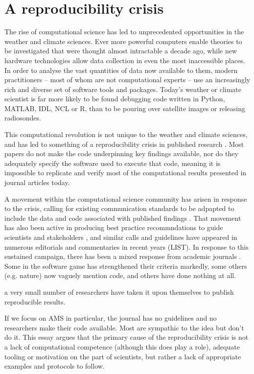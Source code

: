 \section{A reproducibility crisis}
The rise of computational science has led to unprecedented opportunities in the weather and climate sciences. Ever more powerful computers enable theories to be investigated that were thought almost intractable a decade ago, while new hardware technologies allow data collection in even the most inaccessible places. In order to analyse the vast quantities of data now available to them, modern practitioners – most of whom are not computational experts – use an increasingly rich and diverse set of software tools and packages. Today's weather or climate scientist is far more likely to be found debugging code written in Python, MATLAB, IDL, NCL or R, than to be pouring over satellite images or releasing radiosondes. 

This computational revolution is not unique to the weather and climate sciences, and has led to something of a reproducibility crisis in published research \citep[e.g.][]{Peng2011}. Most papers do not make the code underpinning key findings available, nor do they adequately specify the software used to execute that code, meaning it is impossible to replicate and verify most of the computational results presented in journal articles today.

A movement within the computational science community has arisen in response to the crisis, calling for existing communication standards to be adpapted to include the data and code associated with published findings \citep[e.g.][]{Stodden2014}. That movement has also been active in producing best practice recommndations to guide scientists and stakeholders \citep{Stodden2014}, and similar calls and guidelines have appeared in numerous editorials and commentaries in recent years (LIST). In response to this sustained campaign, there has been a mixed response from academic journals \citet{Stodden2013}. Some in the software game has strengthened their criteria markedly, some others (e.g. nature) now vaguely mention code, and others have done nothing at all. 

a very small number of researchers have taken it upon themselves to publish reproducible results. 

If we focus on AMS in particular, the journal has no guidelines and no researchers make their code available. Most are sympathic to the idea but don't do it. This essay argues that the primary cause of the reproducibility crisis is not a lack of computational competence (although this does play a role), adequate tooling or motivation on the part of scientists, but rather a lack of appropriate examples and protocols to follow.

